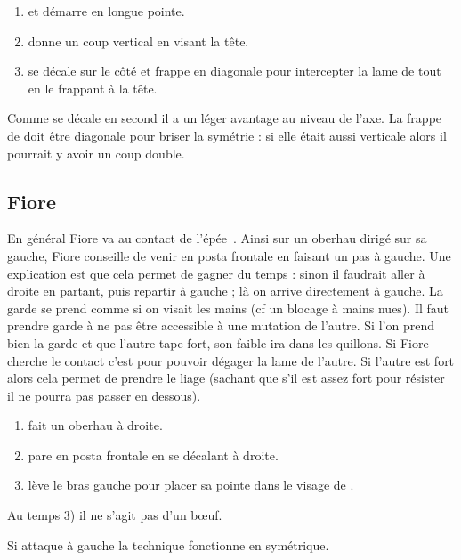 \begin{technique}

\begin{enumerate}
	\item \A et \D démarre en longue pointe.
	
	\item \A donne un coup vertical en visant la tête.
	
	\item \D se décale sur le côté et frappe en diagonale pour intercepter la lame de \A tout en le frappant à la tête.
\end{enumerate}

Comme \D se décale en second il a un léger avantage au niveau de l'axe.
La frappe de \D doit être diagonale pour briser la symétrie : si elle était aussi verticale alors il pourrait y avoir un coup double.

\end{technique}


\subsection{Fiore}


En général Fiore va au contact de l'épée~\cite{campo:dijon:posta_frontale:2015}.
Ainsi sur un oberhau dirigé sur sa gauche, Fiore conseille de venir en posta frontale en faisant un pas à gauche.
Une explication est que cela permet de gagner du temps : sinon il faudrait aller à droite en partant, puis repartir à gauche ; là on arrive directement à gauche.
La garde se prend comme si on visait les mains (cf un blocage à mains nues).
Il faut prendre garde à ne pas être accessible à une mutation de l'autre.
Si l'on prend bien la garde et que l'autre tape fort, son faible ira dans les quillons.
Si Fiore cherche le contact c'est pour pouvoir dégager la lame de l'autre.
Si l'autre est fort alors cela permet de prendre le liage (sachant que s'il est assez fort pour résister il ne pourra pas passer en dessous).


\begin{technique}

\begin{enumerate}
	\item \A fait un oberhau à droite.
	\item \D pare en posta frontale en se décalant à droite.
	\item \D lève le bras gauche pour placer sa pointe dans le visage de \A.
\end{enumerate}

Au temps 3) il ne s'agit pas d'un bœuf.

Si \A attaque à gauche la technique fonctionne en symétrique.

\end{technique}


